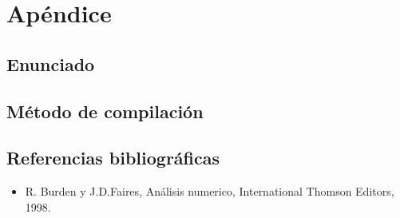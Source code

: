 \section{Ap\'endice}
\subsection{Enunciado}

\subsection{M\'etodo de compilaci\'on}


\subsection{Referencias bibliogr\'aficas}
\begin{itemize}
	\item R. Burden y J.D.Faires, An\'alisis numerico, International Thomson Editors, 1998.
\end{itemize}